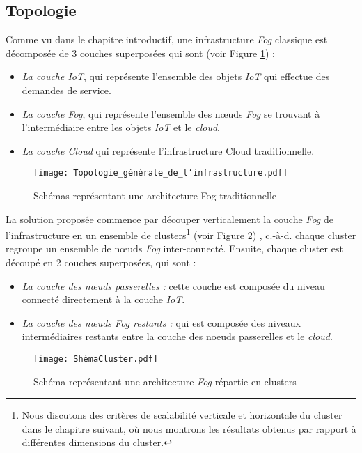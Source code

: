 \subsection{Topologie}
Comme vu dans le chapitre introductif, une infrastructure \emph{Fog} classique est décomposée de 3 couches superposées qui sont (voir Figure \ref{fig:Topologie_generale_de_linfrastructure}) :
\begin{itemize}
    \item \emph{La couche IoT}, qui représente l'ensemble des objets \emph{IoT} qui effectue des demandes de service.
    \item \emph{La couche Fog}, qui représente l'ensemble des nœuds \emph{Fog} se trouvant à l'intermédiaire entre les objets \emph{IoT} et le \emph{cloud}.
    \item \emph{La couche Cloud} qui représente l'infrastructure Cloud traditionnelle.
\end{itemize}
\begin{figure}[H]
    \centering
    \texttt{[image: Topologie\_générale\_de\_l'infrastructure.pdf]}
    \caption{Schémas représentant une architecture Fog traditionnelle}
    \label{fig:Topologie_generale_de_linfrastructure}
\end{figure}
La solution proposée commence par découper verticalement la couche \emph{Fog} de l'infrastructure en un ensemble de clusters\footnote{Nous discutons des critères de scalabilité verticale et horizontale du cluster dans le chapitre suivant, où nous montrons les résultats obtenus par rapport à différentes dimensions du cluster.} (voir Figure \ref{fig:Infrastructure_fog_repartie_en_cluster}) , c.-à-d. chaque cluster regroupe un ensemble de nœuds \emph{Fog} inter-connecté. Ensuite, chaque cluster est découpé en 2 couches superposées, qui sont :
\begin{itemize}
    \item \emph{La couche des nœuds passerelles :}  cette couche est composée du niveau connecté directement à la couche \emph{IoT}.
    \item \emph{La couche des nœuds Fog restants :} qui est composée des niveaux intermédiaires restants entre la couche des noeuds passerelles et le \emph{cloud}.
\end{itemize}
\begin{figure}[H]
    \centering
    \texttt{[image: ShémaCluster.pdf]}
    \caption{Schéma représentant une architecture \emph{Fog} répartie en clusters}
    \label{fig:Infrastructure_fog_repartie_en_cluster}
\end{figure}

